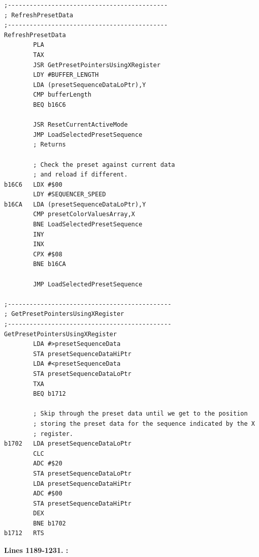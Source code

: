 \clearpage
\begin{lstlisting}[basicstyle=\ttfamily\scriptsize]
;--------------------------------------------
; RefreshPresetData
;--------------------------------------------
RefreshPresetData    
        PLA 
        TAX 
        JSR GetPresetPointersUsingXRegister
        LDY #BUFFER_LENGTH
        LDA (presetSequenceDataLoPtr),Y
        CMP bufferLength
        BEQ b16C6

        JSR ResetCurrentActiveMode
        JMP LoadSelectedPresetSequence
        ; Returns

        ; Check the preset against current data
        ; and reload if different.
b16C6   LDX #$00
        LDY #SEQUENCER_SPEED
b16CA   LDA (presetSequenceDataLoPtr),Y
        CMP presetColorValuesArray,X
        BNE LoadSelectedPresetSequence
        INY 
        INX 
        CPX #$08
        BNE b16CA

        JMP LoadSelectedPresetSequence

;---------------------------------------------
; GetPresetPointersUsingXRegister
;---------------------------------------------
GetPresetPointersUsingXRegister   
        LDA #>presetSequenceData
        STA presetSequenceDataHiPtr
        LDA #<presetSequenceData
        STA presetSequenceDataLoPtr
        TXA 
        BEQ b1712

        ; Skip through the preset data until we get to the position
        ; storing the preset data for the sequence indicated by the X
        ; register.
b1702   LDA presetSequenceDataLoPtr
        CLC 
        ADC #$20
        STA presetSequenceDataLoPtr
        LDA presetSequenceDataHiPtr
        ADC #$00
        STA presetSequenceDataHiPtr
        DEX 
        BNE b1702
b1712   RTS 

\end{lstlisting}
\clearpage

\textbf{Lines 1189-1231. :} 
\clearpage

